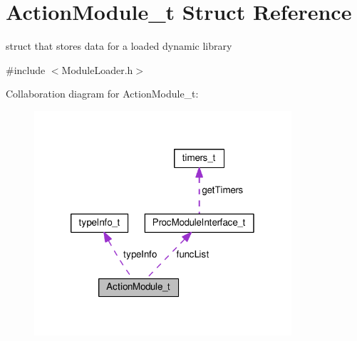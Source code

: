 \hypertarget{structActionModule__t}{}\section{Action\+Module\+\_\+t Struct Reference}
\label{structActionModule__t}


struct that stores data for a loaded dynamic library  




{\ttfamily \#include $<$Module\+Loader.\+h$>$}



Collaboration diagram for Action\+Module\+\_\+t\+:
\nopagebreak
\begin{figure}[H]
\begin{center}
\leavevmode
\includegraphics[width=271pt]{structActionModule__t__coll__graph}
\end{center}
\end{figure}
